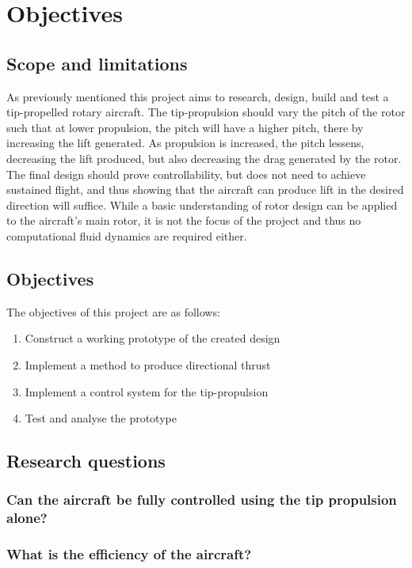 \chapter{Objectives}

\section{Scope and limitations}
    As previously mentioned this project aims to research, design, build and test a tip-propelled rotary aircraft. The tip-propulsion should vary the pitch of the rotor such that at lower propulsion, the pitch will have a higher pitch, there by increasing the lift generated. As propulsion is increased, the pitch lessens, decreasing the lift produced, but also decreasing the drag generated by the rotor. The final design should prove controllability, but does not need to achieve sustained flight, and thus showing that the aircraft can produce lift in the desired direction will suffice. While a basic understanding of rotor design can be applied to the aircraft's main rotor, it is not the focus of the project and thus no computational fluid dynamics are required either. 

\section{Objectives}
    The objectives of this project are as follows:
    \begin{enumerate}
        \item Construct a working prototype of the created design 
        \item Implement a method to produce directional thrust
        \item Implement a control system for the tip-propulsion
        \item Test and analyse the prototype
    \end{enumerate}
\section{Research questions}
    \subsection{Can the aircraft be fully controlled using the tip propulsion alone?}
    \subsection{What is the efficiency of the aircraft?}
